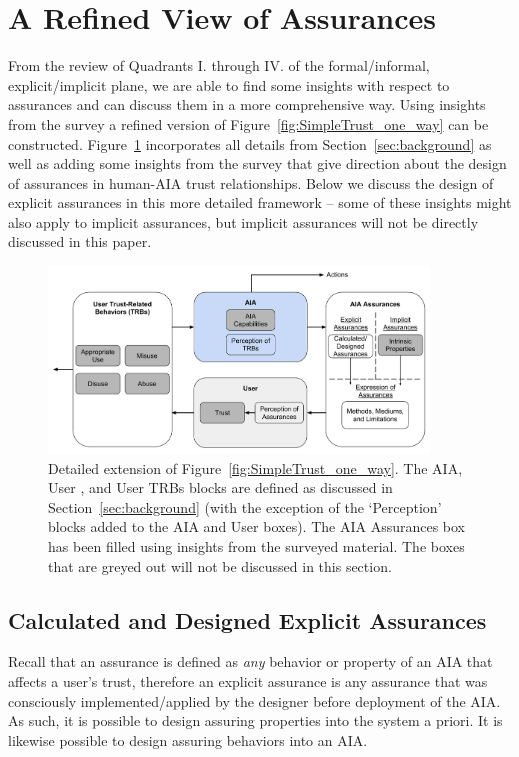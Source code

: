 \section{A Refined View of Assurances} \label{sec:synthesis}
    From the review of Quadrants I. through IV. of the formal/informal, explicit/implicit plane, we are able to find some insights with respect to assurances and can discuss them in a more comprehensive way. Using insights from the survey a refined version of Figure~\ref{fig:SimpleTrust_one_way} can be constructed. Figure~\ref{fig:refined_assurances} incorporates all details from Section~\ref{sec:background} as well as adding some insights from the survey that give direction about the design of assurances in human-AIA trust relationships. Below we discuss the design of explicit assurances in this more detailed framework -- some of these insights might also apply to implicit assurances, but implicit assurances will not be directly discussed in this paper.

    \begin{figure}[htbp]
        \centering
        \includegraphics[width=0.9\textwidth]{Figures/RefinedTrust_one_way}
        \caption{Detailed extension of Figure~\ref{fig:SimpleTrust_one_way}. The AIA, User , and User TRBs blocks are defined as discussed in Section~\ref{sec:background} (with the exception of the `Perception' blocks added to the AIA and User boxes). The AIA Assurances box has been filled using insights from the surveyed material. The boxes that are greyed out will not be discussed in this section.}
        \label{fig:refined_assurances}
    \end{figure}

\subsection{Calculated and Designed Explicit Assurances}
    Recall that an assurance is defined as \emph{any} behavior or property of an AIA that affects a user's trust, therefore an explicit assurance is any assurance that was consciously implemented/applied by the designer before deployment of the AIA. As such, it is possible to design assuring properties into the system a priori. It is likewise possible to design assuring behaviors into an AIA.

